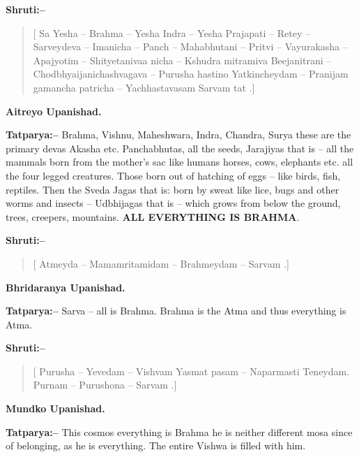 \textbf{Shruti:–}

\begin{verse}
[ Sa Yesha – Brahma – Yesha Indra – Yesha Prajapati – Retey – Sarveydeva – Imanicha – Panch – Mahabhutani – Pritvi – Vayurakasha – Apajyotim – Shityetanivaa nicha – Kshudra mitramiva Beejanitrani – Chodbhyaijanichashvagava – Purusha hastino Yatkincheydam – Pranijam gamancha patricha – Yachhastavasam Sarvam tat .]
\end{verse}

\begin{flushright}
\textbf{Aitreyo Upanishad.}
\end{flushright}

\textbf{Tatparya:–} Brahma, Vishnu, Maheshwara, Indra, Chandra, Surya these are the primary devas Akasha etc. Panchabhutas, all the seeds, Jarajiyas that is – all the mammals born from the mother's sac like humans horses, cows, elephants etc. all the four legged creatures. Those born out of hatching of eggs – like birds, fish, reptiles. Then the Sveda Jagas that is: born by sweat like lice, bugs and other worms and insects – Udbhijagas that is – which grows from below the ground, trees, creepers, mountains. \textbf{ALL EVERYTHING IS BRAHMA}.

\textbf{Shruti:–}

\begin{verse}
[ Atmeyda – Mamamritamidam – Brahmeydam – Sarvam .]
\end{verse}

\begin{flushright}
\textbf{Bhridaranya Upanishad.}
\end{flushright}

\textbf{Tatparya:–} Sarva – all is Brahma. Brahma is the Atma and thus everything is Atma.

\textbf{Shruti:–}

\begin{verse}
[ Purusha – Yevedam – Vishvam  Yasmat pasam – Naparmasti  Teneydam. Purnam – Purushona – Sarvam .]
\end{verse}

\begin{flushright}
\textbf{Mundko Upanishad.}
\end{flushright}

\textbf{Tatparya:–} This cosmos everything is Brahma he is neither different mosa since of belonging, as he is everything. The entire Vishwa is filled with him.

